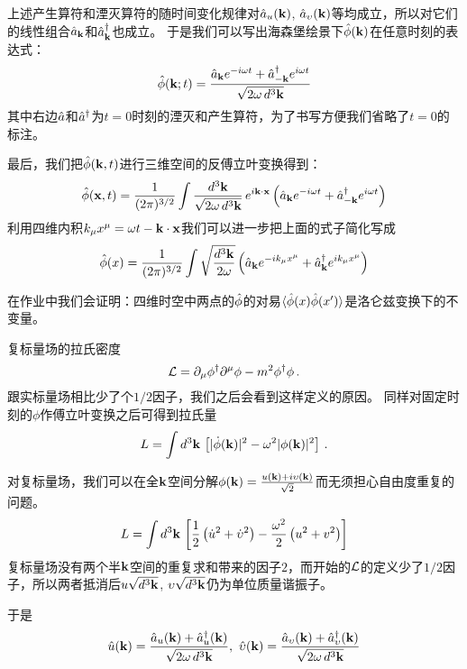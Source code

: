 \documentclass[CJK]{beamer}
\begin{document}
\begin{frame}
\bch
上述产生算符和湮灭算符的随时间变化规律对${\hat{a}}_u({\mathbf{k}})$, ${\hat{a}}_\upsilon({\mathbf{k}})$等均成立，所以对它们的线性组合${\hat{a}}_{{\mathbf{k}}}$和${\hat{a}^\dagger}_{{\mathbf{k}}}$也成立。
于是我们可以写出海森堡绘景下${\hat{\phi}}({\mathbf{k}})$在任意时刻的表达式：
$${\hat{\phi}}({\mathbf{k}}; t) = \frac{{\hat{a}}_{{\mathbf{k}}}e^{-i\omega t} +{\hat{a}^\dagger}_{-{\mathbf{k}}}e^{i\omega t}}{\sqrt{2\omega\, d^3{\mathbf{k}}}}$$
其中右边${\hat{a}}$和${\hat{a}^\dagger}$为$t=0$时刻的湮灭和产生算符，为了书写方便我们省略了$t=0$的标注。
\ech
\end{frame}

\begin{frame}
\bch
最后，我们把${\hat{\phi}}({\mathbf{k}}, t)$进行三维空间的反傅立叶变换得到：
$${\hat{\phi}}({\mathbf{x}}, t) = \frac{1}{(2\pi)^{3/2}}\int \frac{d^3{\mathbf{k}}}{\sqrt{2\omega\, d^3{\mathbf{k}}}} \, e^{i{\mathbf{k}}\cdot{\mathbf{x}}}\left({\hat{a}}_{{\mathbf{k}}}e^{-i\omega t} +{\hat{a}^\dagger}_{-{\mathbf{k}}}e^{i\omega t}\right)$$
利用四维内积$k_\mu x^\mu = \omega t - {\mathbf{k}}\cdot {\mathbf{x}}$我们可以进一步把上面的式子简化写成
$${\hat{\phi}}(x) = \frac{1}{(2\pi)^{3/2}} \int \sqrt{\frac{d^3{\mathbf{k}}}{2\omega}} \left({\hat{a}}_{{\mathbf{k}}} e^{-ik_\mu x^\mu} + {\hat{a}^\dagger}_{{\mathbf{k}}}e^{ik_\mu x^\mu}\right) $$

\skipline
在作业中我们会证明：四维时空中两点的${\hat{\phi}}$的对易$\langle {\hat{\phi}}(x){\hat{\phi}}(x') \rangle$是洛仑兹变换下的不变量。
\ech
\end{frame}


\begin{frame}
\bch
复标量场的拉氏密度
$${\mathcal{L}} = \partial_\mu\phi^\dagger \partial^\mu \phi - m^2\phi^\dagger\phi\, .$$
跟实标量场相比少了个$1/2$因子，我们之后会看到这样定义的原因。
\skipline
同样对固定时刻的$\phi$作傅立叶变换之后可得到拉氏量
$$L = \int d^3{\mathbf{k}} \, \left[|\dot\phi({\mathbf{k}})|^2 - \omega^2|\phi({\mathbf{k}})|^2 \right]\, .$$
\ech
\end{frame}


\begin{frame}
\bch
对复标量场，我们可以在全${\mathbf{k}}$空间分解$\phi({\mathbf{k}}) = \frac{u({\mathbf{k}}) + i \upsilon({\mathbf{k}})}{\sqrt{2}}$而无须担心自由度重复的问题。
$$L = \int d^3{\mathbf{k}}\,\left[ \frac{1}{2}\left(\dot u^2 + \dot {\upsilon}^2 \right) - \frac{\omega^2}{2}\left(u^2+v^2\right)\right]$$
复标量场没有两个半${\mathbf{k}}$空间的重复求和带来的因子$2$，而开始的${\mathcal{L}}$的定义少了$1/2$因子，所以两者抵消后$u\sqrt{d^3{\mathbf{k}}}$, $\upsilon\sqrt{d^3{\mathbf{k}}}$仍为单位质量谐振子。

于是
$$\hat{u}(\veck)  = \frac{\hata_u(\veck) + \adag_u(\veck)}{\sqrt{2\omega\, d^3\veck}},\ \hat{\vel}(\veck)  = \frac{\hata_{\vel}(\veck) + \adag_{\vel}(\veck)}{\sqrt{2\omega\, d^3\veck}}$$

\ech
\end{frame}
\end{document}
